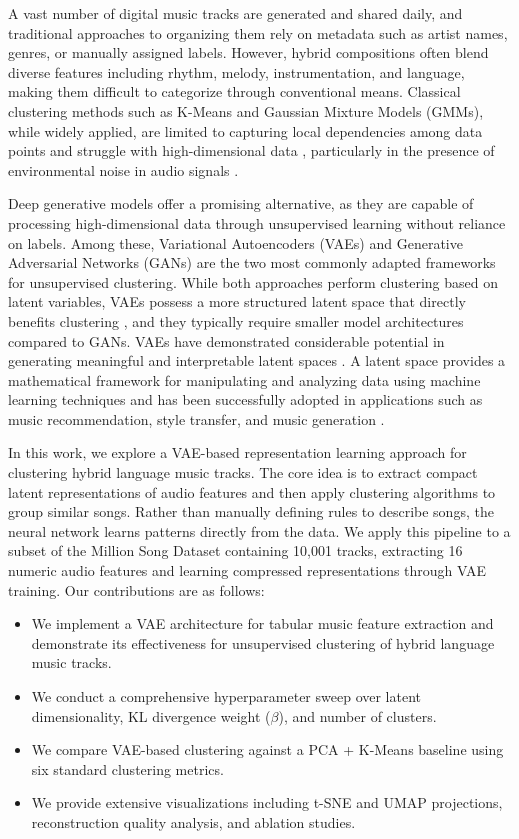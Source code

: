 \documentclass[11pt]{article}
\begin{document}
A vast number of digital music tracks are generated and shared daily, and traditional approaches to organizing them rely on metadata such as artist names, genres, or manually assigned labels. However, hybrid compositions often blend diverse features including rhythm, melody, instrumentation, and language, making them difficult to categorize through conventional means. Classical clustering methods such as K-Means and Gaussian Mixture Models (GMMs), while widely applied, are limited to capturing local dependencies among data points and struggle with high-dimensional data \citep{mckinney2003features}, particularly in the presence of environmental noise in audio signals \citep{fiorio2025clustering}.

Deep generative models offer a promising alternative, as they are capable of processing high-dimensional data through unsupervised learning without reliance on labels. Among these, Variational Autoencoders (VAEs) \citep{kingma2014auto} and Generative Adversarial Networks (GANs) are the two most commonly adapted frameworks for unsupervised clustering. While both approaches perform clustering based on latent variables, VAEs possess a more structured latent space that directly benefits clustering \citep{fiorio2025clustering}, and they typically require smaller model architectures compared to GANs. VAEs have demonstrated considerable potential in generating meaningful and interpretable latent spaces \citep{carvalho2023exploring, wang2020pianotree}. A latent space provides a mathematical framework for manipulating and analyzing data using machine learning techniques and has been successfully adopted in applications such as music recommendation, style transfer, and music generation \citep{carvalho2023exploring}.

In this work, we explore a VAE-based representation learning approach for clustering hybrid language music tracks. The core idea is to extract compact latent representations of audio features and then apply clustering algorithms to group similar songs. Rather than manually defining rules to describe songs, the neural network learns patterns directly from the data. We apply this pipeline to a subset of the Million Song Dataset \citep{bertin2011million} containing 10,001 tracks, extracting 16 numeric audio features and learning compressed representations through VAE training. Our contributions are as follows:

\begin{itemize}
    \item We implement a VAE architecture for tabular music feature extraction and demonstrate its effectiveness for unsupervised clustering of hybrid language music tracks.
    \item We conduct a comprehensive hyperparameter sweep over latent dimensionality, KL divergence weight ($\beta$), and number of clusters.
    \item We compare VAE-based clustering against a PCA + K-Means baseline using six standard clustering metrics.
    \item We provide extensive visualizations including t-SNE and UMAP projections, reconstruction quality analysis, and ablation studies.
\end{itemize}
\end{document}
